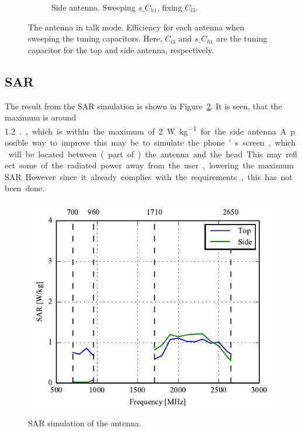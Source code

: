 \begin{figure}[htbp]
\begin{subfigure}{0.49\linewidth}
        \caption{Side antenna. Sweeping $s\_C_{h1}$, fixing $C_{l3}$.}
    \end{subfigure}
    \caption{The antenna in talk mode. Efficiency for each antenna when sweeping the tuning capacitors. Here, $C_{l3}$ and $s\_C_{h1}$ are the tuning capacitor for the top and side antenna, respectively.}
    \label{fig:eff_sol3talk}
\end{figure}


\FloatBarrier
\subsection{SAR}

The result from the SAR simulation is shown in Figure~\ref{fig:ant3_sar_sim}. It is seen, that the maximum is around \SI{1.2}{.}, which is within the maximum of \SI{2}{W\per kg} for the side antenna. A possible way to improve this may be to simulate the phone's screen, which will be located between (part of) the antenna and the head. This may reflect some of the radiated power away from the user, lowering the maximum SAR. However since it already complies with the requirements, this has not been done. 

\begin{figure}[htbp]
    \centering
    \includegraphics{img/tech_sol/nonresonant/simulation/sar/Sar_top_side.pdf}
    \caption{SAR simulation of the antenna.}
    \label{fig:ant3_sar_sim}
\end{figure}



